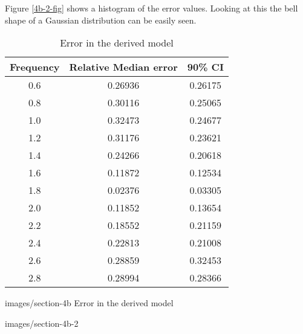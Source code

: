 Figure \ref{4b-2-fig} shows a histogram of the error values.  Looking at this
the bell shape of a Gaussian distribution can be easily seen.

\begin{table}
\centering
\begin{tabular}{c|c|c}
Frequency & Relative Median error & 90\% CI \\
\hline
0.6 & 0.26936 & 0.26175 \\
0.8 & 0.30116 & 0.25065 \\
1.0 & 0.32473 & 0.24677 \\
1.2 & 0.31176 & 0.23621 \\
1.4 & 0.24266 & 0.20618 \\
1.6 & 0.11872 & 0.12534 \\
1.8 & 0.02376 & 0.03305 \\
2.0 & 0.11852 & 0.13654 \\
2.2 & 0.18552 & 0.21159 \\
2.4 & 0.22813 & 0.21008 \\
2.6 & 0.28859 & 0.32453 \\
2.8 & 0.28994 & 0.28366 
\end{tabular}
\caption{Error in the derived model\label{4b}}
\end{table}

              {images/section-4b}
              {Error in the derived model\label{4b-fig}}

              {images/section-4b-2}
              {\label{4b-2-fig}}

























